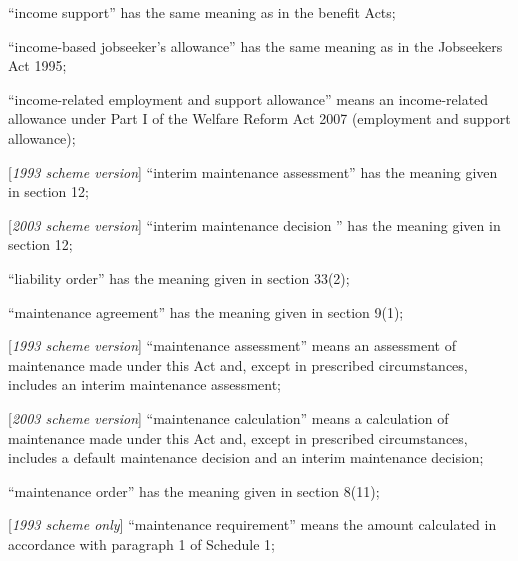 \documentclass[12pt,a4paper]{article}
\begin{document}
\begin{enumerate}


    “income support” has the same meaning as in the benefit Acts;

“income-based jobseeker’s allowance” has the same meaning as in the Jobseekers Act 1995;

“income-related employment and support allowance” means an income-related allowance under Part I of the Welfare Reform Act 2007 (employment and support allowance);

    [\emph{1993 scheme version}] “interim maintenance assessment” has the meaning given in section 12;

    [\emph{2003 scheme version}] “interim maintenance 
decision%
” has the meaning given in section 12;

    “liability order” has the meaning given in section 33(2);

    “maintenance agreement” has the meaning given in section 9(1);

    [\emph{1993 scheme version}] “maintenance assessment” means an assessment of maintenance made under this Act and, except in prescribed circumstances, includes an interim maintenance assessment;

[\emph{2003 scheme version}] “maintenance calculation” means a calculation of maintenance made under this Act and, except in prescribed circumstances, includes a default maintenance decision and an interim maintenance decision;

    “maintenance order” has the meaning given in section 8(11);

[\emph{1993 scheme only}]         “maintenance requirement” means the amount calculated in accordance with paragraph 1 of Schedule 1;


\end{enumerate}
\end{document}
